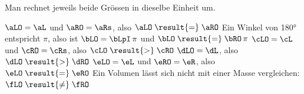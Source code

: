 Man rechnet jeweils beide Grössen in dieselbe Einheit um.
\begin{abcliste}
\abc $\aLO = \aL$ und $\aRO = \aRs$, also $\aLO \;\result{=}\; \aRO$
\abc Ein Winkel von \ang{180} entspricht $\pi$, also ist $\bLO = \bLpI\,\pi$ und $\bLO \;\result{=}\; \bRO\,\pi$
\abc $\cLO = \cL$ und $\cRO = \cRs$, also $\cLO \;\result{>}\; \cRO$
\abc $\dLO = \dL$, also $\dLO \;\result{>}\; \dRO$
\abc $\eLO = \eL$ und $\eRO = \eR$, also $\eLO \;\result{=}\; \eRO$
\abc Ein Volumen lässt sich nicht mit einer Masse vergleichen: $\fLO \;\result{\neq}\; \fRO$
\end{abcliste}
